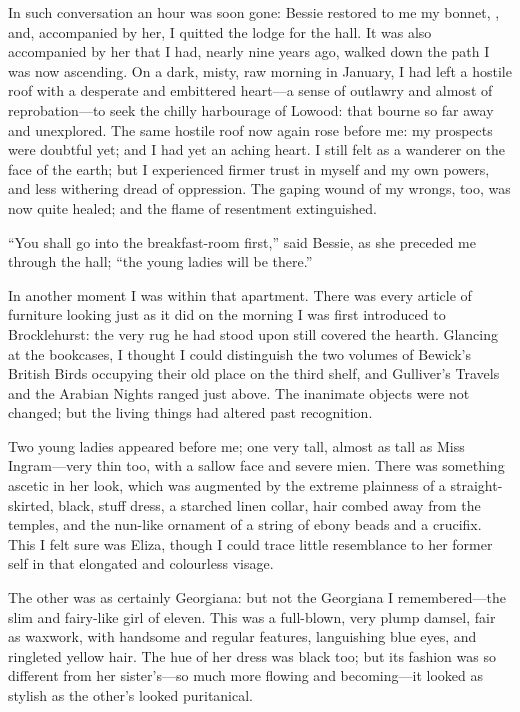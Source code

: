 In such conversation an hour was soon gone: Bessie restored to me my
bonnet, \etc, and, accompanied by her, I quitted the lodge for the
hall. It was also accompanied by her that I had, nearly nine years ago,
walked down the path I was now ascending. On a dark, misty, raw morning
in January, I had left a hostile roof with a desperate and embittered
heart---a sense of outlawry and almost of reprobation---to seek the
chilly harbourage of Lowood: that bourne so far away and unexplored.
The same hostile roof now again rose before me: my prospects were
doubtful yet; and I had yet an aching heart. I still felt as a wanderer
on the face of the earth; but I experienced firmer trust in myself and
my own powers, and less withering dread of oppression. The gaping wound
of my wrongs, too, was now quite healed; and the flame of resentment
extinguished.

\enquote{You shall go into the breakfast-room first,} said Bessie, as
she preceded me through the hall; \enquote{the young ladies will be
	there.}

In another moment I was within that apartment. There was every article
of furniture looking just as it did on the morning I was first
introduced to \Mr{} Brocklehurst: the very rug he had stood upon still
covered the hearth. Glancing at the bookcases, I thought I could
distinguish the two volumes of Bewick's British Birds occupying their
old place on the third shelf, and Gulliver's Travels and the Arabian
Nights ranged just above. The inanimate objects were not changed; but
the living things had altered past recognition.

Two young ladies appeared before me; one very tall, almost as tall as
Miss Ingram---very thin too, with a sallow face and severe mien. There
was something ascetic in her look, which was augmented by the extreme
plainness of a straight-skirted, black, stuff dress, a starched linen
collar, hair combed away from the temples, and the nun-like ornament of
a string of ebony beads and a crucifix. This I felt sure was Eliza,
though I could trace little resemblance to her former self in that
elongated and colourless visage.

The other was as certainly Georgiana: but not the Georgiana I
remembered---the slim and fairy-like girl of eleven. This was a
full-blown, very plump damsel, fair as waxwork, with handsome and
regular features, languishing blue eyes, and ringleted yellow hair. The
hue of her dress was black too; but its fashion was so different from
her sister's---so much more flowing and becoming---it looked as stylish
as the other's looked puritanical.

